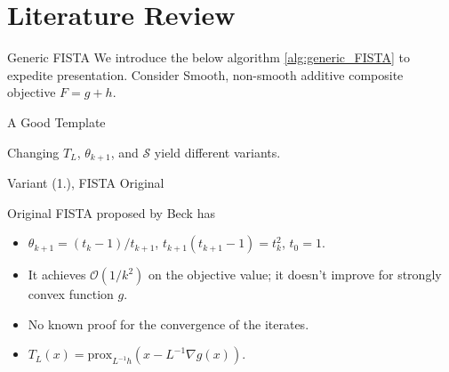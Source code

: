 \documentclass[11pt]{beamer}
\theoremstyle{definition}
\begin{document}
\section{Literature Review}
    \begin{frame}{Generic FISTA}
        We introduce the below algorithm \ref*{alg:generic_FISTA} to expedite presentation. Consider Smooth, non-smooth additive composite objective $F = g + h$. 
        \begin{block}{A Good Template}
            \begin{algorithm}[H]
                \begin{algorithmic}[1]
                    \ENDFOR
                \end{algorithmic}
                \caption{Generic FISTA}
                \label{alg:generic_FISTA}
            \end{algorithm}
        \end{block}
        Changing $T_L$, $\theta_{k + 1}$, and $\mathcal S$ yield different variants. 
    \end{frame}
    \begin{frame}{Variant (1.), FISTA Original}
        \begin{algorithm}[H]
            \begin{tiny}
                \begin{algorithmic}[1]
                    \ENDFOR
                \end{algorithmic}
                \caption{Generic FISTA}    
            \end{tiny}
        \end{algorithm}
        Original FISTA proposed by Beck \cite{beck_fast_2009-1} has 
        \begin{itemize}
            \item $\theta_{k + 1} = (t_k - 1)/t_{k + 1}$, $t_{k + 1}(t_{k + 1} - 1) = t_{k}^2$, $t_0 = 1$. 
            \item It achieves $\mathcal O(1/k^2)$ on the objective value; it doesn't improve for strongly convex function $g$. 
            \item No known proof for the convergence of the iterates. 
            \item $T_L(x) = \text{prox}_{L^{-1}h}(x - L^{-1}\nabla g(x))$. 
        \end{itemize}
    \end{frame}
\end{document}
